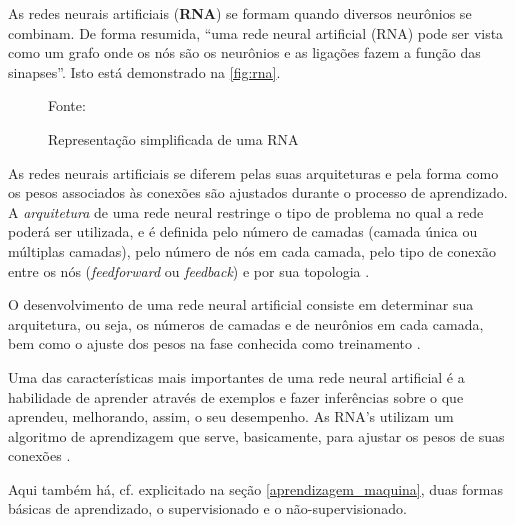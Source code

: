 As redes neurais artificiais (\textbf{RNA}) se formam quando diversos neurônios se combinam. De forma resumida, ``uma rede neural artificial (RNA) pode ser vista como um grafo onde os nós são os neurônios e as ligações fazem a função das sinapses''. Isto está demonstrado na \autoref{fig:rna}.

\begin{figure}[h!]
	\centering
	\caption{Representação simplificada de uma RNA}	

	{\scriptsize 	Fonte: }
	\label{fig:rna}
\end{figure}

As  redes  neurais  artificiais  se  diferem  pelas  suas arquiteturas e pela forma como os pesos associados às conexões são ajustados durante o processo de aprendizado. A \textit{arquitetura} de uma rede neural restringe o tipo de problema no qual a rede poderá ser utilizada, e é definida pelo  número  de  camadas  (camada única  ou múltiplas camadas), pelo número de nós em cada camada, pelo tipo de conexão entre os nós (\textit{feedforward} ou \textit{feedback}) e por sua topologia \cite[p. 46-49]{haykin_redes_2001}.

O desenvolvimento de uma rede neural artificial consiste em determinar sua arquitetura, ou seja, os números de camadas e de neurônios em cada camada, bem como o ajuste dos pesos na fase conhecida como treinamento \cite{hagan_neural_1996} \cite{haykin_redes_2001}.

Uma das características mais importantes de uma rede neural artificial é a habilidade de aprender através de exemplos e fazer inferências sobre o que aprendeu, melhorando, assim, o seu desempenho. As RNA's utilizam um algoritmo de aprendizagem que serve, basicamente, para ajustar os pesos de suas conexões \cite{haykin_redes_2001} \cite{ferneda_redes_2006} \cite{lima_ia_2016} \cite{Norvig2013}. 

Aqui também há, cf. explicitado na seção \ref{aprendizagem_maquina}, duas formas básicas de aprendizado, o supervisionado e o não-supervisionado.

